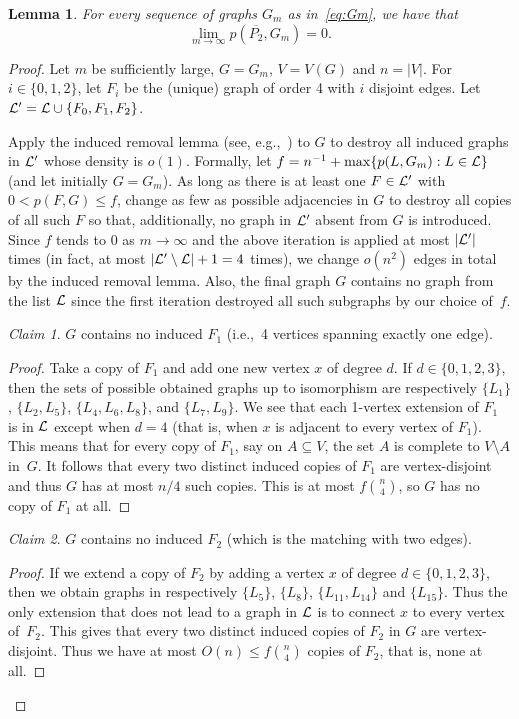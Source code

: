 \documentclass[12pt]{article}
\newtheorem{lemma}[theorem]{Lemma}
\theoremstyle{definition}
\theoremstyle{remark}
\newcommand{\C}[1]{{\protect\mathcal{#1}}}
\renewcommand{\O}[1]{\overline{#1}}
\newtheorem{claim}{Claim}[theorem]
\renewcommand{\mid}{:}
\renewcommand{\le}{\leqslant}
\begin{document}
\begin{lemma}\label{lm:NoCocherries} For every sequence  of graphs $G_m$ as in~\eqref{eq:Gm}, we have that 
	$$
	\lim_{m\to\infty} p(\O{P_2},G_m)=0.
	$$
\end{lemma}

\begin{proof} Let $m$ be sufficiently large, $G=G_m$, $V=V(G)$ and $n=|V|$.
For $i\in\{0,1,2\}$, let $F_i$ be the (unique) graph of order 4 with $i$ disjoint edges. Let $\C L'=\C L\cup\{F_0,F_1,F_2\}$. 

Apply the induced removal lemma (see, e.g.,~\cite{Alon2000,ConFox2013}) to $G$
to destroy  all induced graphs in $\C L'$ whose density is $o(1)$.
Formally, let $f=n^{-1}+\max\{ p(L,G_m)\mid L\in\C L\}$ (and let initially $G=G_m$). As long as there is at least one $F\in\C L'$ with $0<p(F,G)\le f$, change as few as possible adjacencies in $G$ to destroy all copies of all such $F$ so that, additionally, no graph in $\C L'$ absent from $G$ is introduced.
Since $f$ tends to $0$ as $m\to\infty$ and the above iteration is applied at most $|\C L'|$ times (in fact, at most $|\C L'\setminus \C L|+1=4$ times), we change $o(n^2)$ edges in total by the induced removal lemma. Also, the final graph $G$ contains no graph from the list $\C L$ since the first iteration destroyed all such subgraphs by our choice of~$f$.
	
	
	

\begin{claim}\label{cl:NoF1} $G$ contains no induced $F_1$ (i.e.,\ 4 vertices spanning exactly one edge).\end{claim}

\begin{proof} Take a copy of $F_1$ and add one new vertex $x$ of degree $d$. If $d\in\{0,1,2,3\}$, then the sets of possible obtained graphs up to isomorphism are respectively $\{L_1\}$, $\{L_2,L_5\}$, $\{L_4,L_6,L_8\}$, and $\{L_7,L_9\}$. We see that each 1-vertex extension of $F_1$ is in $\C L$ except when $d=4$ (that is, when $x$ is adjacent to every vertex of $F_1$). This means that for every copy of $F_1$, say on $A\subseteq V$, the set $A$ is complete
to $V\setminus A$ in~$G$. It follows that every two distinct induced copies of $F_1$ are vertex-disjoint and thus $G$ has at most $n/4$ such copies. This is at most $f{n\choose 4}$, so $G$ has no copy of $F_1$ at all.\end{proof}


\begin{claim} $G$ contains no induced $F_2$ (which is the matching with two edges).\end{claim}
\begin{proof} If we extend a copy of $F_2$ by adding a vertex $x$ of degree $d\in\{0,1,2,3\}$, then we obtain graphs in respectively $\{L_5\}$, $\{L_8\}$, $\{L_{11},L_{14}\}$ and $\{L_{15}\}$. Thus the only extension that does not lead to a graph in $\C L$ is to connect $x$ to every vertex of~$F_2$. This gives that every two distinct induced copies of $F_2$ in $G$ are vertex-disjoint. Thus we have at most $O(n) \le f{n\choose 4}$ copies of $F_2$, that is, none at all.\end{proof}


\end{proof}
\end{document}
